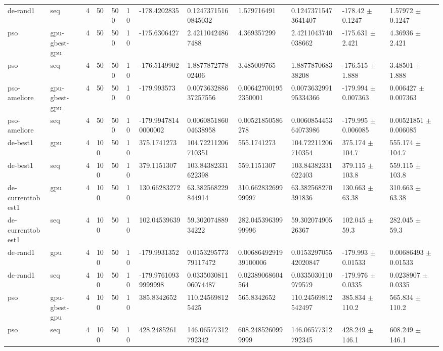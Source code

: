 \begin{table}[t]
\begin{tabular}{llllllllllll}
de-rand1 & seq & 4 & 50 & 500 & 10 & -178.4202835 & 0.12473715160845032 & 1.579716491 & 0.12473715473641407 & -178.42 $\pm$ 0.1247 & 1.57972 $\pm$ 0.1247 \\
pso & gpu-gbest-gpu & 4 & 50 & 500 & 10 & -175.6306427 & 2.42110424867488 & 4.369357299 & 2.4211043740038662 & -175.631 $\pm$ 2.421 & 4.36936 $\pm$ 2.421 \\
pso & seq & 4 & 50 & 500 & 10 & -176.5149902 & 1.887787277802406 & 3.485009765 & 1.887787068338208 & -176.515 $\pm$ 1.888 & 3.48501 $\pm$ 1.888 \\
pso-ameliore & gpu-gbest-gpu & 4 & 50 & 500 & 10 & -179.993573 & 0.007363288637257556 & 0.006427001952350001 & 0.007363299195334366 & -179.994 $\pm$ 0.007363 & 0.006427 $\pm$ 0.007363 \\
pso-ameliore & seq & 4 & 50 & 500 & 10 & -179.99478140000002 & 0.006085186004638958 & 0.00521850586278 & 0.006085445364073986 & -179.995 $\pm$ 0.006085 & 0.00521851 $\pm$ 0.006085 \\
de-best1 & gpu & 4 & 100 & 50 & 10 & 375.1741273 & 104.72211206710351 & 555.1741273 & 104.72211206710354 & 375.174 $\pm$ 104.7 & 555.174 $\pm$ 104.7 \\
de-best1 & seq & 4 & 100 & 50 & 10 & 379.1151307 & 103.84382331622398 & 559.1151307 & 103.84382331622403 & 379.115 $\pm$ 103.8 & 559.115 $\pm$ 103.8 \\
de-currenttobest1 & gpu & 4 & 100 & 50 & 10 & 130.66283272 & 63.382568229844914 & 310.66283269999997 & 63.382568270391836 & 130.663 $\pm$ 63.38 & 310.663 $\pm$ 63.38 \\
de-currenttobest1 & seq & 4 & 100 & 50 & 10 & 102.04539639 & 59.30207488934222 & 282.04539639999996 & 59.30207490526367 & 102.045 $\pm$ 59.3 & 282.045 $\pm$ 59.3 \\
de-rand1 & gpu & 4 & 100 & 50 & 10 & -179.9931352 & 0.015329577379117472 & 0.0068649291939100006 & 0.015329705542020847 & -179.993 $\pm$ 0.01533 & 0.00686493 $\pm$ 0.01533 \\
de-rand1 & seq & 4 & 100 & 50 & 10 & -179.97610939999998 & 0.033503081106074487 & 0.02389068604564 & 0.0335030110979579 & -179.976 $\pm$ 0.0335 & 0.0238907 $\pm$ 0.0335 \\
pso & gpu-gbest-gpu & 4 & 100 & 50 & 10 & 385.8342652 & 110.245698125425 & 565.8342652 & 110.24569812542497 & 385.834 $\pm$ 110.2 & 565.834 $\pm$ 110.2 \\
pso & seq & 4 & 100 & 50 & 10 & 428.2485261 & 146.06577312792342 & 608.2485260999999 & 146.06577312792345 & 428.249 $\pm$ 146.1 & 608.249 $\pm$ 146.1 \\

\end{tabular}
\end{table}
